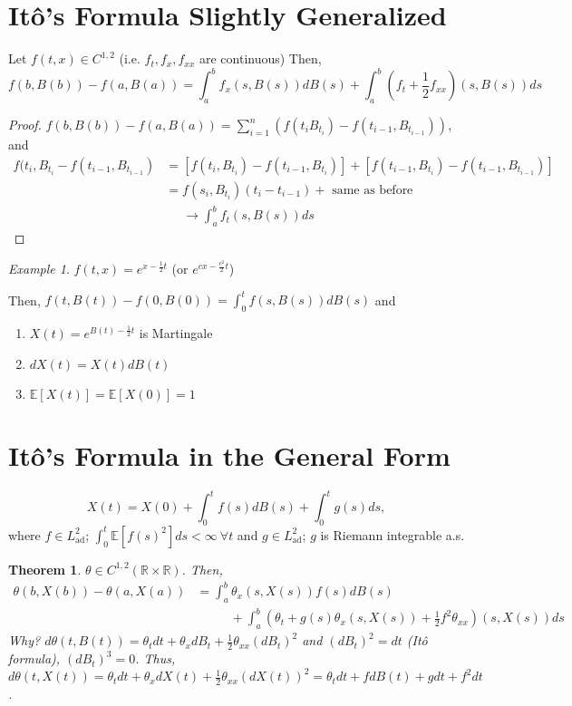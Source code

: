 \documentclass[12pt]{report}
\newcommand{\R}{\mathbb{R}}
\newcommand{\E}{\mathbb{E}}
\renewcommand{\1}{\mathbb{1}}
\theoremstyle{break}
\newtheorem{thm}{Theorem}[section] %
\theoremstyle{newdef}
\theoremstyle{remark}
\newtheorem*{exmp}{Example} %
\begin{document}
\setcounter{section}{2}
\section{It\^o's Formula Slightly Generalized}
Let $f(t,x) \in C^{1,2}$ (i.e. $f_t, f_x, f_{xx}$ are continuous)
Then,
$$
f(b,B(b)) - f(a,B(a))
= \int_a^b f_x(s,B(s))dB(s) + \int_a^b (f_t + \frac{1}{2} f_{xx})(s,B(s))ds
$$

\begin{proof}
$f(b,B(b)) - f(a,B(a)) = 
\sum_{i=1}^n (f(t_i B_{t_i}) - f(t_{i-1}, B_{t_{i-1}}))$, and
$$
\begin{aligned}
f(t_i, B_{t_i} - f(t_{i-1}, B_{t_{i-1}})
&= \left[f(t_i, B_{t_i}) - f(t_{i-1}, B_{t_i})\right]
+ \left[f(t_{i-1}, B_{t_{i}}) - f(t_{i-1}, B_{t_{i-1}})\right]\\
&= f(s_i, B_{t_i})(t_i - t_{i-1}) + \text{ same as before}\\
&\phantom{=}\rightarrow \int_a^b f_t(s,B(s))ds
\end{aligned}
$$
\end{proof}

\begin{exmp}
$f(t,x) = e^{x-\frac{1}{2}t}$ (or $e^{cx - \frac{c^2}{2}t}$)

Then, $f(t,B(t)) - f(0,B(0))
= \int_0^t f(s,B(s))dB(s)$ and
\begin{enumerate}
\item $X(t) = e^{B(t) - \frac{1}{2}t}$ is Martingale
\item $dX(t) = X(t)dB(t)$
\item $\E[X(t)] = \E[X(0)] = 1$
\end{enumerate}
\end{exmp}


\section{It\^o's Formula in the General Form}
$$
X(t) = X(0) + \int_0^t f(s)dB(s) + \int_0^t g(s)ds,
$$
where $f \in L^2_{\text{ad}}$; $\int_0^t \E[f(s)^2]ds < \infty \ \forall t$ and
$g \in L^2_{\text{ad}}$; $g$ is Riemann integrable a.s.


\begin{thm}
$\theta \in C^{1,2}(\R\times\R)$. Then,
$$
\begin{aligned}
\theta(b,X(b)) - \theta(a,X(a))
&= \int_a^b \theta_x(s,X(s))f(s)dB(s)\\
&\phantom{==}+ \int_a^b \left(\theta_t + g(s)\theta_x(s,X(s)) + \frac{1}{2}f^2 \theta_{xx}\right)(s,X(s))ds
\end{aligned}
$$
Why? $d\theta(t,B(t)) = \theta_t dt + \theta_x dB_t + \frac{1}{2} \theta_{xx}(dB_t)^2$ and $(dB_t)^2 = dt$ (It\^o formula), $(dB_t)^3 = 0$.
Thus, $d\theta(t,X(t)) = \theta_tdt + \theta_x dX(t) + \frac{1}{2} \theta_{xx}(dX(t))^2
= \theta_tdt + fdB(t) + gdt + f^2dt$.
\end{thm}
\end{document}

